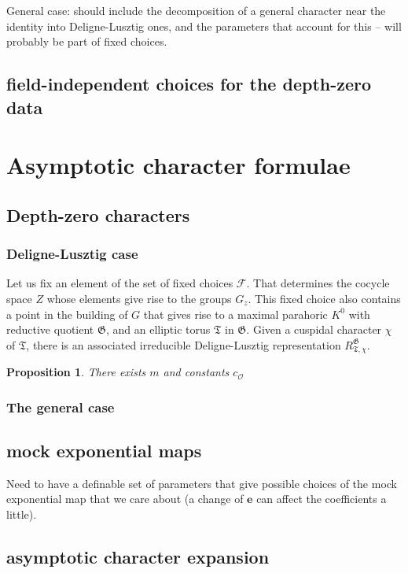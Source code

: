 \documentclass[12pt]{amsart}
\newcommand{\cF}{\mathcal{F}}
\newcommand{\cO}{{\mathcal O}}
\newcommand{\mexp}{\mathbf{e}}
\def\cO{\mathcal{O}}
\def\cF{\mathcal{F}}
\newcommand{\fG}{\mathfrak G}
\newcommand{\fT}{\mathfrak T}
\theoremstyle{plain}
\newtheorem{prop}[thm]{Proposition}
\theoremstyle{definition}
\begin{document}
General case: should include the decomposition of a general character near the identity into Deligne-Lusztig ones, and the parameters that account for this -- will probably be part of fixed choices. 

\subsection{field-independent choices for the depth-zero data}




\section{Asymptotic character formulae}

\subsection{Depth-zero characters}
\subsubsection{Deligne-Lusztig case} Let us fix an element of the set of fixed choices $\cF$. 
That determines the cocycle space $Z$ whose elements give rise to the groups $G_z$. This fixed 
choice also contains a point in the building of $G$ that gives rise to a maximal parahoric  $K^0$
 with reductive quotient $\fG$, and an elliptic torus $\fT$ in $\fG$. 
Given a cuspidal character $\chi$ of $\fT$, there is an associated irreducible Deligne-Lusztig representation $R_{\fT, \chi}^\fG$. 
\begin{prop} There exists $m$ and constants $c_{\cO}$
\end{prop}

\subsubsection{The general case}

\subsection{mock exponential maps}
Need to have a definable set of parameters that give possible choices of the mock exponential map that we care about (a change of $\mexp$ can affect the coefficients a little). 

\subsection{asymptotic character expansion}
\end{document}
